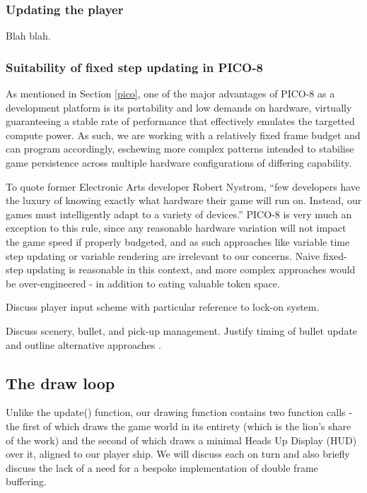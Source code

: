 \documentclass[11pt]{article}
\begin{document}
\subsubsection*{Updating the player}

Blah blah.

\subsubsection*{Suitability of fixed step updating in PICO-8}

As mentioned in Section \ref{pico}, one of the major advantages of PICO-8 as a development platform
is its portability and low demands on hardware, virtually guaranteeing a stable rate of performance
that effectively emulates the targetted compute power. As such, we are working with a relatively fixed
frame budget and can program accordingly, eschewing more complex patterns intended to stabilise
game persistence across multiple hardware configurations of differing capability.

To quote former Electronic Arts developer Robert Nystrom\cite[p. 126]{nystrom}, ``few developers have
the luxury of knowing exactly what hardware their game will run on. Instead, our games must intelligently
adapt to a variety of devices.'' PICO-8 is very much an exception to this rule, since any reasonable
hardware variation will not impact the game speed if properly budgeted, and as such approaches like
variable time step updating or variable rendering are irrelevant to our concerns. Naive fixed-step updating
is reasonable in this context, and more complex approaches would be over-engineered - in addition to eating
valuable token space.

Discuss player input scheme with particular reference to lock-on system.

Discuss scenery, bullet, and pick-up management. Justify timing of bullet update and outline alternative
approaches \cite{nystrom}.
\subsection{The draw loop}

Unlike the \textunderscore update() function, our drawing function contains two function calls - the first of which
draws the game world in its entirety (which is the lion's share of the work) and the second of which
draws a minimal Heads Up Display (HUD) over it, aligned to our player ship. We will discuss each on turn
and also briefly discuss the lack of a need for a bespoke implementation of double frame buffering.
\end{document}
